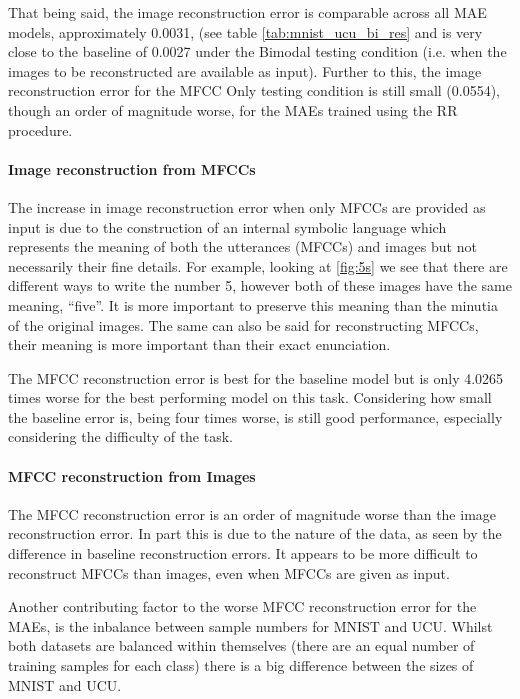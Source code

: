 That being said, the image reconstruction error is comparable across all \ac{MAE} models, approximately 0.0031, (see table \autoref{tab:mnist_ucu_bi_res} and is very close to the baseline of 0.0027 under the Bimodal testing condition (i.e. when the images to be reconstructed are available as input). Further to this, the image reconstruction error for the \ac{MFCC} Only testing condition is still small (0.0554), though an order of magnitude worse, for the \acp{MAE} trained using the RR procedure.

\paragraph{Image reconstruction from MFCCs}
The increase in image reconstruction error when only \acp{MFCC} are provided as input is due to the construction of an internal symbolic language which represents the meaning of both the utterances (\acp{MFCC}) and images but not necessarily their fine details. For example, looking at \autoref{fig:5s} we see that there are different ways to write the number 5, however both of these images have the same meaning, ``five''. It is more important to preserve this meaning than the minutia of the original images. The same can also be said for reconstructing \acp{MFCC}, their meaning is more important than their exact enunciation.  

The \ac{MFCC} reconstruction error is best for the baseline model but is only 4.0265 times worse for the best performing model on this task. Considering how small the baseline error is, being four times worse, is still good performance, especially considering the difficulty of the task.

\paragraph{MFCC reconstruction from Images}
The \ac{MFCC} reconstruction error is an order of magnitude worse than the image reconstruction error. In part this is due to the nature of the data, as seen by the difference in baseline reconstruction errors. It appears to be more difficult to reconstruct \acp{MFCC} than images, even when \acp{MFCC} are given as input.

Another contributing factor to the worse \ac{MFCC} reconstruction error for the \acp{MAE}, is the inbalance between sample numbers for MNIST and UCU. Whilst both datasets are balanced within themselves (there are an equal number of training samples for each class) there is a big difference between the sizes of MNIST and UCU. 

